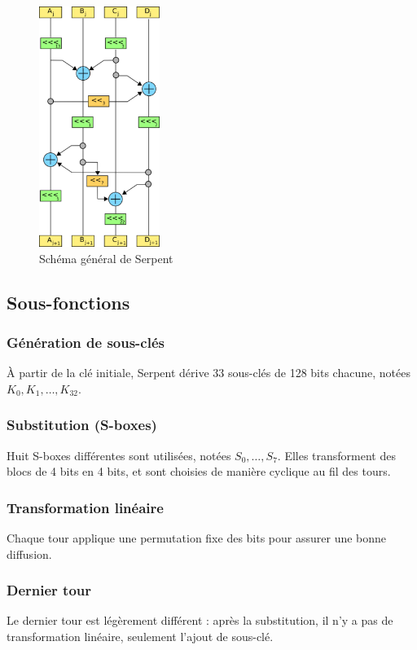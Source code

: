 \documentclass[12pt,a4paper]{report}
\begin{document}
\begin{figure}[h]
    \centering
    \includegraphics[width=0.35\textwidth]{assets/serpent-global.png}
    \caption{Schéma général de Serpent}
\end{figure}

\subsection{Sous-fonctions}

\subsubsection{Génération de sous-clés}
À partir de la clé initiale, Serpent dérive 33 sous-clés de 128 bits chacune, notées $K_0, K_1, \dots, K_{32}$.

\subsubsection{Substitution (S-boxes)}
Huit S-boxes différentes sont utilisées, notées $S_0, \dots, S_7$.  
Elles transforment des blocs de 4 bits en 4 bits, et sont choisies de manière cyclique au fil des tours.

\subsubsection{Transformation linéaire}
Chaque tour applique une permutation fixe des bits pour assurer une bonne diffusion.

\subsubsection{Dernier tour}
Le dernier tour est légèrement différent : après la substitution, il n’y a pas de transformation linéaire, seulement l’ajout de sous-clé.
\end{document}
